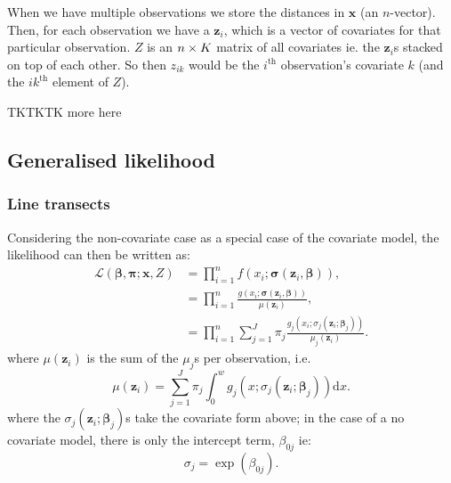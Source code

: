When we have multiple observations we store the distances in $\bm{x}$ (an $n$-vector). Then, for each observation we have a $\bm{z}_i$, which is a vector of covariates for that particular observation. $Z$ is an $n \times K$ matrix of all covariates ie. the $\bm{z}_i$s stacked on top of each other. So then $z_{ik}$ would be the $i^\text{th}$ observation's covariate $k$ (and the $ik^\text{th}$ element of $Z$).

TKTKTK more here

%
%

\subsection{Generalised likelihood}
\label{ds-genlik}

\subsubsection{Line transects}
Considering the non-covariate case as a special case of the covariate model, the likelihood can then be written as:
\begin{align}
\mathcal{L}(\bm{\beta}, \bm{\pi} ; \bm{x}, Z) &= \prod_{i=1}^n f(x_i;\bm{\sigma}(\bm{z}_i, \bm{\beta})),\\
&= \prod_{i=1}^n \frac{g(x_i;\bm{\sigma}(\bm{z}_i, \bm{\beta}))}{\mu(\bm{z}_i)},\\
&= \prod_{i=1}^n \sum_{j=1}^J \pi_j \frac{g_j(x_i; \sigma_j(\bm{z}_i;\bm{\beta}_j))}{ \mu_j(\bm{z}_i)}.
\label{mmds-lt-glikelihood}
\end{align}
where $\mu(\bm{z}_i)$ is the sum of the $\mu_j$s per observation, i.e.
\begin{equation}
\mu(\bm{z}_i) = \sum_{j=1}^J \pi_j \int_0^w g_j(x; \sigma_j(\bm{z}_i;\bm{\beta}_j)) \text{d}x.
\end{equation}
where the $\sigma_j(\bm{z}_i;\bm{\beta}_j)$s take the covariate form above; in the case of a no covariate model, there is only the intercept term, $\beta_{0j}$ ie:
\begin{equation}
\sigma_j = \exp ( \beta_{0j} ).
\end{equation}

